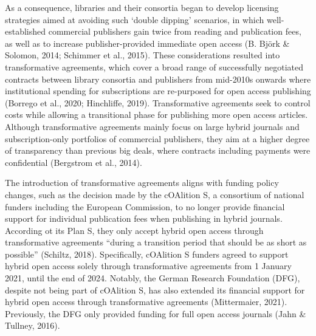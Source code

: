 \documentclass[a4paper,man,floatsintext,longtable,noextraspace,12pt]{apa6}
\begin{document}
As a consequence, libraries and their consortia began to develop
licensing strategies aimed at avoiding such `double dipping' scenarios,
in which well-established commercial publishers gain twice from reading
and publication fees, as well as to increase publisher-provided
immediate open access (B. Björk \& Solomon, 2014; Schimmer et al.,
2015). These considerations resulted into transformative agreements,
which cover a broad range of successfully negotiated contracts between
library consortia and publishers from mid-2010s onwards where
institutional spending for subscriptions are re-purposed for open access
publishing (Borrego et al., 2020; Hinchliffe, 2019). Transformative
agreements seek to control costs while allowing a transitional phase for
publishing more open access articles. Although transformative agreements
mainly focus on large hybrid journals and subscription-only portfolios
of commercial publishers, they aim at a higher degree of transparency
than previous big deals, where contracts including payments were
confidential (Bergstrom et al., 2014).

The introduction of transformative agreements aligns with funding policy
changes, such as the decision made by the cOAlition S, a consortium of
national funders including the European Commission, to no longer provide
financial support for individual publication fees when publishing in
hybrid journals. According ot its Plan S, they only accept hybrid open
access through transformative agreements ``during a transition period
that should be as short as possible'' (Schiltz, 2018). Specifically,
cOAlition S funders agreed to support hybrid open access solely through
transformative agreements from 1 January 2021, until the end of 2024.
Notably, the German Research Foundation (DFG), despite not being part of
cOAlition S, has also extended its financial support for hybrid open
access through transformative agreements (Mittermaier, 2021).
Previously, the DFG only provided funding for full open access journals
(Jahn \& Tullney, 2016).
\end{document}
